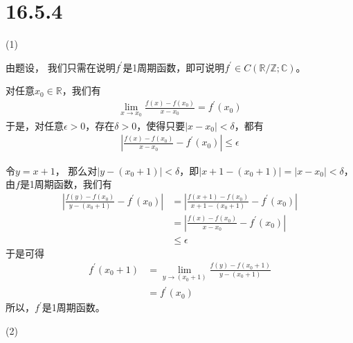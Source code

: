 \documentclass{article}
\begin{document}
\section*{16.5.4}
 (1)

由题设，
我们只需在说明$f^\prime$是1周期函数，即可说明$f^\prime \in C(\mathbb{R}/\mathbb{Z}; \mathbb{C})$。

对任意$x_0 \in \mathbb{R}$，我们有
\begin{align*}
  \lim\limits_{x \to x_0} \frac{f(x) - f(x_0)}{x - x_0} = f^\prime(x_0)
\end{align*}
于是，对任意$\epsilon > 0$，存在$\delta > 0$，使得只要$|x - x_0| < \delta$，都有
\begin{align*}
  |\frac{f(x) - f(x_0)}{x - x_0} - f^\prime(x_0)| \leq \epsilon
\end{align*}

令$y = x + 1$，
那么对$|y - (x_0 + 1)| < \delta$，即$|x + 1 - (x_0 + 1)| = |x - x_0| < \delta$，
由$f$是1周期函数，我们有
\begin{align*}
  |\frac{f(y) - f(x_0)}{y - (x_0 + 1)} - f^\prime(x_0)|
   & = |\frac{f(x + 1) - f(x_0)}{x + 1 - (x_0 + 1)} - f^\prime(x_0)| \\
   & = |\frac{f(x) - f(x_0)}{x - x_0} - f^\prime(x_0)|               \\
   & \leq \epsilon
\end{align*}
于是可得
\begin{align*}
  f^\prime(x_0 + 1)
   & = \lim\limits_{y \to (x_0 + 1)} \frac{f(y) - f(x_0 + 1)}{y - (x_0 + 1)} \\
   & = f^\prime(x_0)
\end{align*}
所以，$f^\prime$是1周期函数。

(2)
\end{document}
